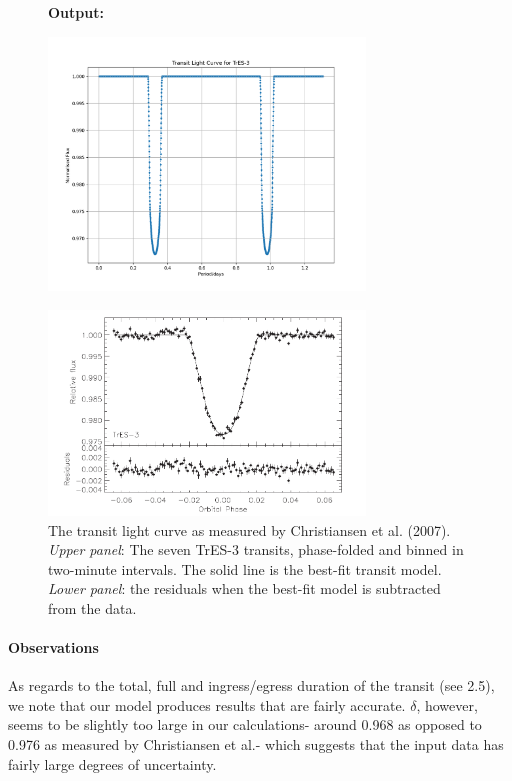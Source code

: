 \documentclass[11pt]{article}
\newcommand*{\figuretitle}[1]{
    	{\textbf{#1}
    	\par\vspace{-1em}}
    }
\begin{document}
    
\begin{figure}[!hbt]
	\figuretitle{Output:}
	\centering
	\includegraphics[width=0.75\textwidth]{../matplotlib_graphs/transit_2.png}
\end{figure} 


\begin{figure}[!hbt]
	\centering
	\includegraphics[width=0.75\textwidth]{../images/TrE-S_light_curve.png}
	\caption{The transit light curve as measured by Christiansen et al. (2007). {\it Upper panel}: The seven TrES-3 transits, phase-folded and binned in two-minute intervals. The solid line is the best-fit transit model. {\it Lower panel}: the residuals when the best-fit model is subtracted from the data.} 
	\label{Figure 4.c}
\end{figure}



    \hypertarget{observations}{%
\paragraph{Observations}\label{observations_3}}

As regards to the total, full and ingress/egress duration of the transit
(see 2.5), we note that our model produces results that are fairly
accurate. \(\delta\), however, seems to be slightly too large in our
calculations- around 0.968 as opposed to 0.976 as measured by
Christiansen et al.- which suggests that the input data has fairly large degrees of uncertainty.
\end{document}
